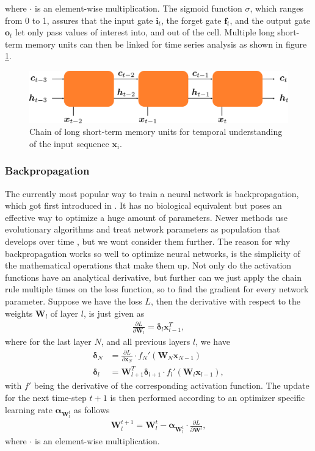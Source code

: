 where $\cdot$ is an element-wise multiplication. The sigmoid function $\sigma$, which ranges from 0 to 1, assures that the input gate $\bm{i}_t$, the forget gate $\bm{f}_t$, and the output gate $\bm{o}_t$ let only pass values of interest into, and out of the cell. Multiple long short-term memory units can then be linked for time series analysis as shown in figure \ref{fig::321_lstm_chain}.
\begin{figure}[h!]
	\centering
	\includegraphics[scale=.28]{chapters/03_background/img/lstm_chain.png}
	\caption{Chain of long short-term memory units for temporal understanding of the input sequence $\bm{x}_i$.}
	\label{fig::321_lstm_chain}
\end{figure}
\subsubsection{Backpropagation}
The currently most popular way to train a neural network is backpropagation, which got first introduced in \cite{linnainmaa1970representation}. It has no biological equivalent but poses an effective way to optimize a huge amount of parameters. Newer methods use evolutionary algorithms and treat network parameters as population that develops over time \cite{montana1989training}, but we wont consider them further. The reason for why backpropagation works so well to optimize neural networks, is the simplicity of the mathematical operations that make them up. Not only do the activation functions have an analytical derivative, but further can we just apply the chain rule multiple times on the loss function, so to find the gradient for every network parameter. Suppose we have the loss $L$, then the derivative with respect to the weights $\bm{W}_l$ of layer $l$, is just given as
\begin{align}
	\frac{\partial L}{\partial \bm{W}_l} = \bm{\delta}_l\bm{x}_{l-1}^T,
	\label{eq::321_bp}
\end{align}
where for the last layer $N$, and all previous layers $l$, we have
\begin{align}
	\bm{\delta}_N &= \frac{\partial L}{\partial \bm{x}_N} \cdot f_N'(\bm{W}_N\bm{x}_{N-1}) \\
	\bm{\delta}_l &= \bm{W}^T_{l+1}\bm{\delta}_{l+1} \cdot f_{l}'(\bm{W}_l\bm{x}_{l-1}),
\end{align} %
with $f'$ being the derivative of the corresponding activation function. The update for the next time-step $t+1$ is then performed according to an optimizer specific learning rate $\bm{\alpha}_{\bm{W}^t_l}$ as follows
\begin{align}
	\bm{W}_l^{t+1} = \bm{W}_l^t - \bm{\alpha}_{\bm{W}^t_l}\cdot\frac{\partial L}{\partial \bm{W}^l},
\end{align}
where $\cdot$ is an element-wise multiplication.